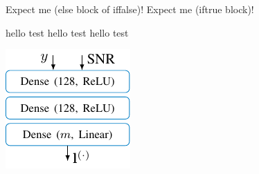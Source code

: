 \ifvar
\fi

Expect me (else block of iffalse)!
Expect me (iftrue block)!

\newcommand{\red}[1]{{\color{red} #1}}
hello test hello
test hello
test




\includegraphics{ext_tikz/test1.pdf}






